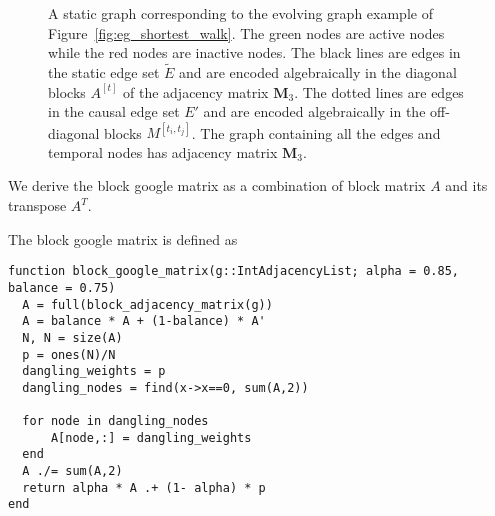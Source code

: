 \documentclass[12pt]{article}
\theoremstyle{definition}
\begin{document}
\begin{figure}[h]
 \begin{center}
\end{center}
\caption{A static graph corresponding to the evolving graph example of
Figure~\ref{fig:eg_shortest_walk}. The green nodes are active nodes while the
red nodes are inactive nodes.
The black lines are edges in the static edge set $\tilde E$ and are encoded
algebraically in the diagonal blocks $A^{[t]}$ of the adjacency matrix $\bm M_3$.
The dotted lines are edges in the causal edge set $E'$ and are encoded algebraically in
the off-diagonal blocks $M^{[t_i, t_j]}$.
The graph containing all the edges and temporal nodes has adjacency matrix $\bm M_3$.}
\label{fig:static}
\end{figure}


We derive the block google matrix as a combination of block matrix $A$ and its transpose $A^T$.

The block google matrix is defined as

\begin{lstlisting}
function block_google_matrix(g::IntAdjacencyList; alpha = 0.85, balance = 0.75)
  A = full(block_adjacency_matrix(g))
  A = balance * A + (1-balance) * A'
  N, N = size(A)
  p = ones(N)/N
  dangling_weights = p
  dangling_nodes = find(x->x==0, sum(A,2))

  for node in dangling_nodes
      A[node,:] = dangling_weights
  end
  A ./= sum(A,2)
  return alpha * A .+ (1- alpha) * p
end
\end{lstlisting}
\end{document}
